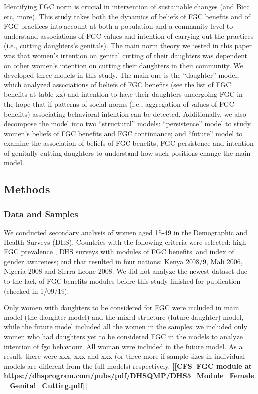 \documentclass[12pt,]{article}
\newcommand{\comment}[1]{\textbf{[[#1]]}}
\newcommand{\cfcmt}[1]{\comment{CFS: #1}}
\begin{document}
Identifying FGC norm is crucial in intervention of sustainable changes \cite{EffeVogt15, RimaLapi15} (and Bicc etc, more).  This study takes both the dynamics of beliefs of FGC benefits and of FGC practices into account at both a population and a community level to understand associations of FGC values and intention of carrying out the practices (i.e., cutting daughters’s genitals).  The main norm theory we tested in this paper was that women’s intention on genital cutting of their daughters was dependent on other women’s intention on cutting their daughters in their community.  We developed three models in this study.  The main one is the “daughter” model, which analyzed associations of beliefs of FGC benefits (see the list of FGC benefits at table xx) and intention to have their daughters undergoing FGC in the hope that if patterns of social norms (i.e., aggregation of values of FGC benefits) associating behavioral intention can be detected.  Additionally, we also decompose the model into two “structural” models:  “persistence” model to study women’s beliefs of FGC benefits and FGC continuance; and “future” model to examine the association of beliefs of FGC benefits, FGC persistence and intention of genitally cutting daughters to understand how such positions change the main model.

\subsection{Methods}\label{methods}

\subsubsection{Data and Samples}\label{data-and-samples}

We conducted secondary analysis of women aged 15-49 in the Demographic and Health Surveys (DHS).  Countries with the following criteria were selected:  high FGC prevalence \cite{UNIC16}, DHS surveys with modules of FGC benefits, and index of gender awareness; and that resulted in four nations:  Kenya 2008/9, Mali 2006, Nigeria 2008 and Sierra Leone 2008.  We did not analyze the newest dataset due to the lack of FGC benefits modules before this study finished for publication (checked in 1/09/19).

Only women with daughters to be considered for FGC were included in main model (the daughter model) and the mixed structure (future-daughter) model, while the future model included all the women in the samples; we included only women who had daughters yet to be considered FGC in the models to analyze intention of fgc behaviour.  All woman were included in the future model.  As a result,  there were xxx, xxx and xxx (or three more if sample sizes in individual models are different from the full models) respectively.
\cfcmt{FGC module at \url{https://dhsprogram.com/pubs/pdf/DHSQMP/DHS5_Module_Female_Genital_Cutting.pdf}}
\end{document}
